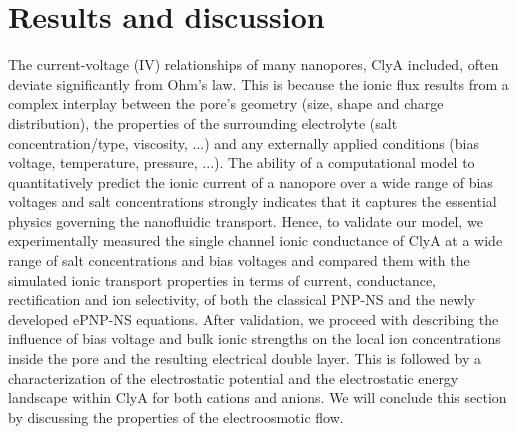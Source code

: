 \documentclass[journal=ancac3,manuscript=article,etalmode=truncate,maxauthors=0,layout=onecolumn]{achemso}
\begin{document}
\section{Results and discussion}\label{sec:results}

The current-voltage (IV) relationships of many nanopores, ClyA included, often
deviate significantly from Ohm's law. This is because the ionic flux results
from a complex interplay between the pore's geometry (size, shape and charge
distribution), the properties of the surrounding electrolyte (salt
concentration/type, viscosity, ...) and any externally applied conditions (bias
voltage, temperature, pressure, ...). The ability of a computational model to
quantitatively predict the ionic current of a nanopore over a wide range of bias
voltages and salt concentrations strongly indicates that it captures the
essential physics governing the nanofluidic transport. Hence, to validate our
model, we experimentally measured the single channel ionic conductance of ClyA
at a wide range of salt concentrations and bias voltages and compared them with
the simulated ionic transport properties in terms of current, conductance,
rectification and ion selectivity, of both the classical PNP-NS and the newly
developed ePNP-NS equations. After validation, we proceed with describing the
influence of bias voltage and bulk ionic strengths on the local ion
concentrations inside the pore and the resulting electrical double layer. This
is followed by a characterization of the electrostatic potential and the
electrostatic energy landscape within ClyA for both cations and anions. We will
conclude this section by discussing the properties of the electroosmotic flow.
\end{document}
